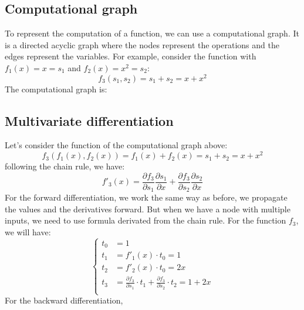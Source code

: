 \documentclass[12pt, openany]{report}
\theoremstyle{definition}
\begin{document}
\subsection{Computational graph}  
To represent the computation of a function, we can use a computational graph. It is a directed acyclic graph where the nodes represent the operations and the edges represent the variables. For example, consider the function with $f_1(x)=x=s_1$ and $f_2(x)=x^2=s_2$:
\begin{equation}
  f_3(s_1,s_2) = s_1 + s_2 = x + x^2
\end{equation}
The computational graph is:\\
\begin{center}
\end{center}
\subsection{Multivariate differentiation}
Let's consider the function of the computational graph above:
\begin{equation}
  f_3(f_1(x),f_2(x)) = f_1(x) + f_2(x) = s_1 + s_2 = x + x^2 
\end{equation}
following the chain rule, we have:
\begin{equation}
  f'_3(x) = \frac{\partial f_3}{\partial s_1} \frac{\partial s_1}{\partial x} + \frac{\partial f_3}{\partial s_2} \frac{\partial s_2}{\partial x}
\end{equation}
For the forward differentiation, we work the same way as before, we propagate the values and the derivatives forward. But when we have a node with multiple inputs, we need to use formula derivated from the chain rule. For the function $f_3$, we will have:
\begin{equation}
  \begin{cases}
    t_0 &= 1 \\
    t_1 &= f'_1(x) \cdot t_0 = 1\\
    t_2 &= f'_2(x) \cdot t_0 = 2x\\
    t_3 &= \frac{\partial f_3}{\partial s_1} \cdot t_1 + \frac{\partial f_3}{\partial s_2} \cdot t_2 = 1 + 2x\\
  \end{cases}
\end{equation}
For the backward differentiation, 
\end{document}
